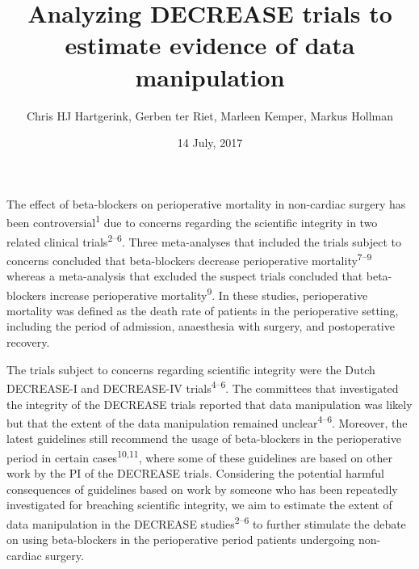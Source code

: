 \documentclass[]{article}
\title{Analyzing DECREASE trials to estimate evidence of data manipulation}
\author{Chris HJ Hartgerink, Gerben ter Riet, Marleen Kemper, Markus Hollman}
\date{14 July, 2017}
\begin{document}
\maketitle

The effect of beta-blockers on perioperative mortality in non-cardiac
surgery has been controversial\textsuperscript{1} due to concerns
regarding the scientific integrity in two related clinical
trials\textsuperscript{2--6}. Three meta-analyses that included the
trials subject to concerns concluded that beta-blockers decrease
perioperative mortality\textsuperscript{7--9} whereas a meta-analysis
that excluded the suspect trials concluded that beta-blockers increase
perioperative mortality\textsuperscript{9}. In these studies,
perioperative mortality was defined as the death rate of patients in the
perioperative setting, including the period of admission, anaesthesia
with surgery, and postoperative recovery.

The trials subject to concerns regarding scientific integrity were the
Dutch DECREASE-I and DECREASE-IV trials\textsuperscript{4--6}. The
committees that investigated the integrity of the DECREASE trials
reported that data manipulation was likely but that the extent of the
data manipulation remained unclear\textsuperscript{4--6}. Moreover, the
latest guidelines still recommend the usage of beta-blockers in the
perioperative period in certain cases\textsuperscript{10,11}, where some
of these guidelines are based on other work by the PI of the DECREASE
trials. Considering the potential harmful consequences of guidelines
based on work by someone who has been repeatedly investigated for
breaching scientific integrity, we aim to estimate the extent of data
manipulation in the DECREASE studies\textsuperscript{2--6} to further
stimulate the debate on using beta-blockers in the perioperative period
patients undergoing non-cardiac surgery.
\end{document}
